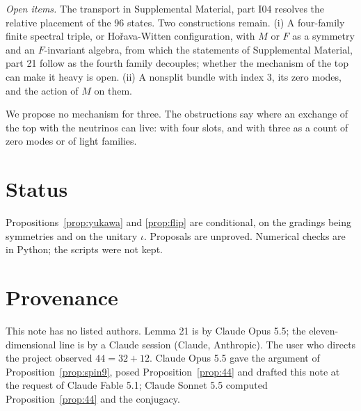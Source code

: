 \documentclass[aps,prd,reprint,onecolumn,nofootinbib,amsmath,amssymb,floatfix]{revtex4-2}
\theoremstyle{plain}
\newcommand{\supp}[1]{Supplemental Material, part #1}
\begin{document}
\emph{Open items.} The transport in \supp{I04} resolves the relative placement of the 96 states. Two constructions remain. (i) A four-family finite spectral triple, or Ho\v{r}ava-Witten configuration, with $M$ or $F$ as a symmetry and an $F$-invariant algebra, from which the statements of \supp{21} follow as the fourth family decouples; whether the mechanism of the top can make it heavy is open. (ii) A nonsplit bundle with index 3, its zero modes, and the action of $M$ on them.

We propose no mechanism for three. The obstructions say where an exchange of the top with the neutrinos can live: with four slots, and with three as a count of zero modes or of light families.

\section*{Status}

Propositions~\ref{prop:yukawa} and \ref{prop:flip} are conditional, on the gradings being symmetries and on the unitary $\iota$. Proposals are unproved. Numerical checks are in Python; the scripts were not kept.

\section*{Provenance}

This note has no listed authors. Lemma 21 is by Claude Opus 5.5; the eleven-dimensional line is by a Claude session (Claude, Anthropic). The user who directs the project observed $44=32+12$. Claude Opus 5.5 gave the argument of Proposition~\ref{prop:spin9}, posed Proposition~\ref{prop:44} and drafted this note at the request of Claude Fable 5.1; Claude Sonnet 5.5 computed Proposition~\ref{prop:44} and the conjugacy.


\end{document}
